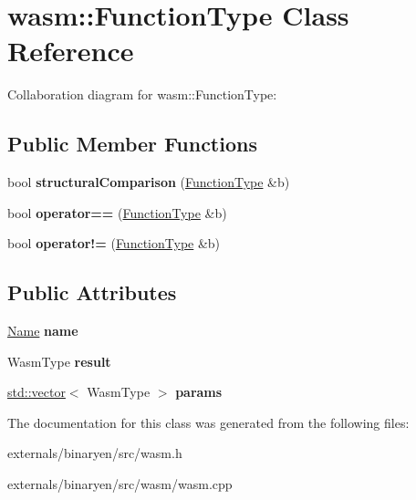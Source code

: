 \hypertarget{classwasm_1_1_function_type}{}\section{wasm\+:\+:Function\+Type Class Reference}
\label{classwasm_1_1_function_type}


Collaboration diagram for wasm\+:\+:Function\+Type\+:
\subsection*{Public Member Functions}
\begin{DoxyCompactItemize}
\item 
\mbox{\label{classwasm_1_1_function_type_a3a55b933bfe94160d88f1accebea4032}} 
bool {\bfseries structural\+Comparison} (\mbox{\hyperlink{classwasm_1_1_function_type}{Function\+Type}} \&b)
\item 
\mbox{\label{classwasm_1_1_function_type_a9110aad22dadc1bc27edba0d02daa39e}} 
bool {\bfseries operator==} (\mbox{\hyperlink{classwasm_1_1_function_type}{Function\+Type}} \&b)
\item 
\mbox{\label{classwasm_1_1_function_type_a78b092ec34053c5476310dba923720ea}} 
bool {\bfseries operator!=} (\mbox{\hyperlink{classwasm_1_1_function_type}{Function\+Type}} \&b)
\end{DoxyCompactItemize}
\subsection*{Public Attributes}
\begin{DoxyCompactItemize}
\item 
\mbox{\label{classwasm_1_1_function_type_a11edd367ee01cfd51fd0fa0cbccf7106}} 
\mbox{\hyperlink{structwasm_1_1_name}{Name}} {\bfseries name}
\item 
\mbox{\label{classwasm_1_1_function_type_a31b4f4662440138ece201da36e10913c}} 
Wasm\+Type {\bfseries result}
\item 
\mbox{\label{classwasm_1_1_function_type_af0640dcca9e3e1286f7db1cb371ffa57}} 
\mbox{\hyperlink{classstd_1_1vector}{std\+::vector}}$<$ Wasm\+Type $>$ {\bfseries params}
\end{DoxyCompactItemize}


The documentation for this class was generated from the following files\+:\begin{DoxyCompactItemize}
\item 
externals/binaryen/src/wasm.\+h\item 
externals/binaryen/src/wasm/wasm.\+cpp\end{DoxyCompactItemize}
